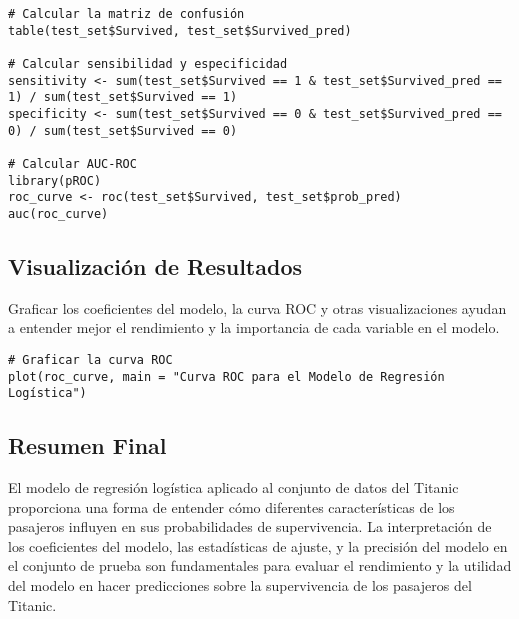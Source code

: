 \begin{verbatim}
# Calcular la matriz de confusión
table(test_set$Survived, test_set$Survived_pred)

# Calcular sensibilidad y especificidad
sensitivity <- sum(test_set$Survived == 1 & test_set$Survived_pred == 1) / sum(test_set$Survived == 1)
specificity <- sum(test_set$Survived == 0 & test_set$Survived_pred == 0) / sum(test_set$Survived == 0)

# Calcular AUC-ROC
library(pROC)
roc_curve <- roc(test_set$Survived, test_set$prob_pred)
auc(roc_curve)
\end{verbatim}

\subsection*{Visualización de Resultados}

Graficar los coeficientes del modelo, la curva ROC y otras visualizaciones ayudan a entender mejor el rendimiento y la importancia de cada variable en el modelo.

\begin{verbatim}
# Graficar la curva ROC
plot(roc_curve, main = "Curva ROC para el Modelo de Regresión Logística")
\end{verbatim}

\subsection*{Resumen Final}

El modelo de regresión logística aplicado al conjunto de datos del Titanic proporciona una forma de entender cómo diferentes características de los pasajeros influyen en sus probabilidades de supervivencia. La interpretación de los coeficientes del modelo, las estadísticas de ajuste, y la precisión del modelo en el conjunto de prueba son fundamentales para evaluar el rendimiento y la utilidad del modelo en hacer predicciones sobre la supervivencia de los pasajeros del Titanic.


